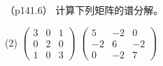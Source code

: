\documentclass[12pt, a4paper, oneside, UTF8]{ctexbook}
\begin{document}
\begin{question}（p141.6）
    计算下列矩阵的谱分解。
    \begin{tasks}[label=(\arabic*)](2)
        \task $\begin{pmatrix}
            3&0&1\\
            0&2&0\\
            1&0&3
        \end{pmatrix}$
        \task $\begin{pmatrix}
            5&-2&0\\
            -2&6&-2\\
            0&-2&7
        \end{pmatrix}$
    \end{tasks}
\end{question}
\end{document}
